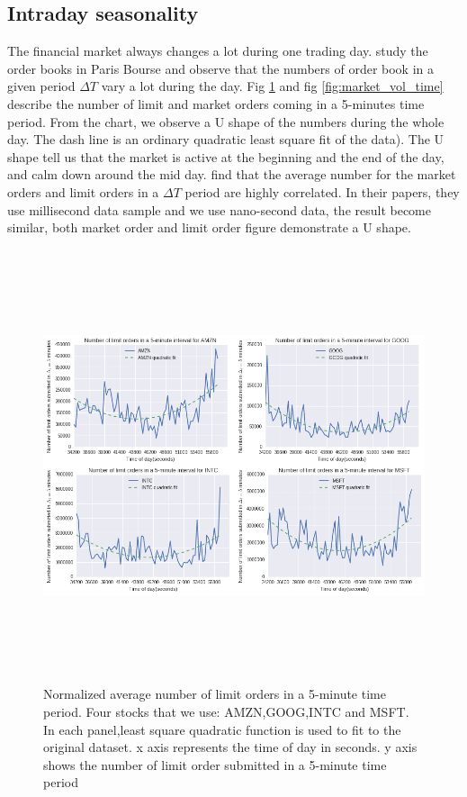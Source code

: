 \subsection{Intraday seasonality} 
The financial market always changes a lot during one trading day. \cite{biais1995empirical} study the order books in Paris Bourse and observe that the numbers of order book in a given period $\Delta T$ vary a lot during the day. Fig \ref{fig:limit_vol_time} and fig \ref {fig:market_vol_time} describe the number of limit and market orders coming in a 5-minutes time period. From the chart, we observe a U shape of the numbers during the whole day. The dash line is an ordinary quadratic least square fit of the data). The U shape tell us that the market is active at the beginning and the end of the day, and calm down around the mid day. \cite{potters2003more} find that the average number for the market orders and limit orders in a $\Delta T$ period are highly correlated. In their papers, they use millisecond data sample and we use nano-second data, the result become similar, both market order and limit order figure demonstrate a U shape. 

\begin{figure}[hbtp]
	\begin{center}
		\includegraphics[width=6in,height=5in]{figures/limit_vol_time.png}
	\end{center}
	\caption{Normalized average number of limit orders in a 5-minute time period. Four stocks that we use: AMZN,GOOG,INTC and MSFT. In each panel,least square quadratic function is used to fit to the original dataset. x axis represents the time of day in seconds. y axis shows the number of limit order submitted in a 5-minute time period} \label{fig:limit_vol_time}
\end{figure}


